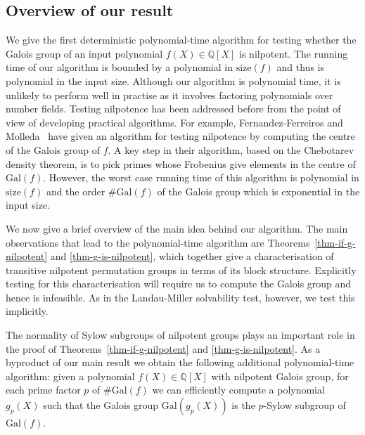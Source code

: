 \documentclass[prodmod,acmtalg]{acmsmall}
\newcommand{\size}[1]{{\ensuremath{\mathrm{size}\left(#1\right)}}}
\newcommand{\Gal}[1]{{\ensuremath{\mathrm{Gal}\left(#1\right)}}}
\newcommand{\Q}{\ensuremath{\mathbb{Q}}}
\begin{document}


\subsection*{Overview of our result}

We give the first deterministic polynomial-time algorithm for testing
whether the Galois group of an input polynomial $f(X) \in \Q[X]$ is
nilpotent. The running time of our algorithm is bounded by a
polynomial in $\size{f}$ and thus is polynomial in the input size.
Although our algorithm is polynomial time, it is unlikely to perform
well in practise as it involves factoring polynomials over number
fields. Testing nilpotence has been addressed before from the point of
view of developing practical algorithms. For example,
Fernandez-Ferreiros and Molleda~\cite{pilar2003deciding-nilpotence}
have given an algorithm for testing nilpotence by computing the centre
of the Galois group of $f$. A key step in their algorithm, based on
the Chebotarev density theorem, is to pick primes whose Frobenius give
elements in the centre of $\Gal{f}$.  However, the worst case running
time of this algorithm is polynomial in $\size{f}$ and the order $\#
\Gal{f}$ of the Galois group which is exponential in the input size.

We now give a brief overview of the main idea behind our algorithm.
The main observations that lead to the polynomial-time algorithm are
Theorems~\ref{thm-if-g-nilpotent} and \ref{thm-g-is-nilpotent}, which
together give a characterisation of transitive nilpotent permutation
groups in terms of its block structure. Explicitly testing for this
characterisation will require us to compute the Galois group and hence
is infeasible. As in the Landau-Miller solvability test, however, we
test this implicitly.

The normality of Sylow subgroups of nilpotent groups plays an
important role in the proof of Theorems~\ref{thm-if-g-nilpotent} and
\ref{thm-g-is-nilpotent}. As a byproduct of our main result we obtain
the following additional polynomial-time algorithm: given a polynomial
$f(X)\in \Q[X]$ with nilpotent Galois group, for each prime factor $p$
of $\# \Gal{f}$ we can efficiently compute a polynomial $g_p(X)$ such
that the Galois group $\Gal{g_p(X)}$ is the $p$-Sylow subgroup of
$\Gal{f}$.
\end{document}
